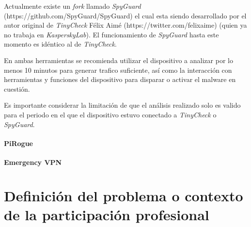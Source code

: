 \documentclass[12pt]{caltech_thesis}
\begin{document}
Actualmente existe un \textit{fork} llamado \textit{SpyGuard} (https://github.com/SpyGuard/SpyGuard) el cual esta siendo desarrollado por el autor original de \textit{TinyCheck} Félix Aimé (https://twitter.com/felixaime) (quien ya no trabaja en \textit{KasperskyLab}). El funcionamiento de \textit{SpyGuard} hasta este momento es idéntico al de \textit{TinyCheck}.

En ambas herramientas se recomienda utilizar el dispositivo a analizar por lo menos 10 minutos para generar trafico suficiente, así como la interacción con herramientas y funciones del dispositivo para disparar o activar el malware en cuestión.

Es importante considerar la limitación de que el análisis realizado solo es valido para el periodo en el que el dispositivo estuvo conectado a \textit{TinyCheck} o \textit{SpyGuard}.

\subsubsection{PiRogue}

\subsubsection{Emergency VPN}





\chapter{Definición del problema o contexto de la participación profesional}
\end{document}
